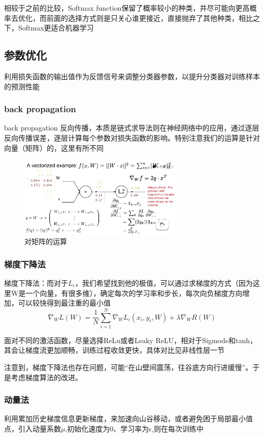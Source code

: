 \documentclass[12pt]{article}
\begin{document}
相较于之前的比较，Softmax function保留了概率较小的种类，并尽可能向更高概率去优化，而前面的选择方式则是只关心谁更接近，直接抛弃了其他种类，相比之下，Softmax更适合机器学习

\subsection{参数优化}
利用损失函数的输出值作为反馈信号来调整分类器参数，以提升分类器对训练样本的预测性能

\subsubsection{back propagation}
back propagation 反向传播，本质是链式求导法则在神经网络中的应用，通过逐层反向传播误差，逐层计算每个参数对损失函数的影响。特别注意我们的运算是针对向量（矩阵）的，这里有所不同
\begin{figure}[ht]  %
\centering
\includegraphics[width=0.7\textwidth]{pic9.jpg}
\caption{对矩阵的运算}
\end{figure}

\subsubsection{梯度下降法}
梯度下降法：而对于$L_i$，我们希望找到他的极值，可以通过求梯度的方式（因为这里W是一个向量，有很多维），确定每次的学习率和步长，每次向负梯度方向增加，可以较快得到最注重的最小值
\\$$\nabla_W L(W)=\frac{1}{N} \sum_{i=1}^{N} \nabla_W L_i(x_i,y_i,W)+\lambda\nabla_W R(W)$$

面对不同的激活函数，尽量选择ReLu或者Leaky ReLU，相对于Sigmode和tanh，其会让梯度流更加顺畅，训练过程收敛更快，具体对比见非线性层一节

注意到，梯度下降法也存在问题，可能“在山壁间震荡，往谷底方向行进缓慢”。于是考虑梯度算法的改进。

\subsubsection{动量法}
利用累加历史梯度信息更新梯度，来加速向山谷移动，或者避免困于局部最小值点，引入动量系数$\mu$,初始化速度为0、学习率为$\epsilon$,则在每次训练中
\end{document}
